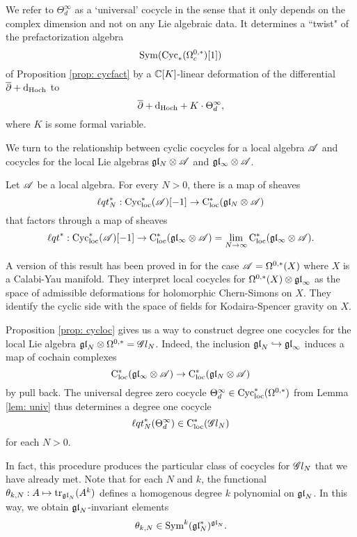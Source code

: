 We refer to $\Theta^\infty_d$ as a `universal' cocycle in the sense that it only depends on the complex dimension and not on any Lie algebraic data. 
It determines a ``twist" of the prefactorization algebra 
\[
{\rm Sym}({\rm Cyc}_*(\Omega^{0,*}_c)[1])
\]
of Proposition \ref{prop: cycfact} by a $\mathbb C[K]$-linear deformation of the differential $\overline{\partial} + {\rm d}_{\rm Hoch}$ to
\[
\overline{\partial} + {\rm d}_{\rm Hoch} + K \cdot \Theta^\infty_d ,
\] 
where $K$ is some formal variable. 

We turn to the relationship between cyclic cocycles for a local algebra $\mathscr A$ and cocycles for the local Lie algebras $\mathfrak{g} \mathfrak{l}_N \otimes \mathscr A$ and $\mathfrak{g} \mathfrak{l}_\infty \otimes \mathscr A$.

\begin{prop}
\label{prop: cycloc}
Let $\mathscr A$ be a local algebra.
For every $N > 0$, there is a map of sheaves
\[
{\ell q t}_N^* : {\rm Cyc}_{\rm loc}^*(\mathscr A)[-1] \to {\rm C}_{\rm loc}^*(\mathfrak{g} \mathfrak{l}_N \otimes \mathscr A) 
\] 
that factors through a map of sheaves
\[
{\ell q t}^* : {\rm Cyc}_{\rm loc}^*(\mathscr A)[-1] \to {\rm C}_{\rm loc}^*(\mathfrak{g} \mathfrak{l}_\infty \otimes \mathscr A) = \lim_{N \to \infty} {\rm C}_{\rm loc}^*(\mathfrak{g} \mathfrak{l}_\infty \otimes \mathscr A)  .
\]
\end{prop}


\begin{rmk}
A version of this result has been proved in \cite{CL1} for the case $\mathscr A = \Omega^{0,*}(X)$ where $X$ is a Calabi-Yau manifold.
They interpret local cocycles for $\Omega^{0,*}(X) \otimes {\mathfrak{gl}}_\infty$ as the space of admissible deformations for holomorphic Chern-Simons on $X$. 
They identify the cyclic side with the space of fields for Kodaira-Spencer gravity \cite{BCOV} on $X$.
\end{rmk}

Proposition \ref{prop: cycloc} gives us a way to construct degree one cocycles for the local Lie algebra ${\mathfrak{gl}}_N \otimes \Omega^{0,*} = \mathscr G l_{N}$. 
Indeed, the inclusion ${\mathfrak{gl}}_N \hookrightarrow {\mathfrak{gl}}_\infty$ induces a map of cochain complexes 
\[
{\rm C}_{\rm loc}^*(\mathfrak{g} \mathfrak{l}_\infty \otimes \mathscr A) \to {\rm C}_{\rm loc}^*(\mathfrak{g} \mathfrak{l}_N \otimes \mathscr A)
\]
by pull back. 
The universal degree zero cocycle $\Theta_d^\infty \in {\rm Cyc}_{\rm loc}^*(\Omega^{0,*})$ from Lemma \ref{lem: univ} thus determines a degree one cocycle 
\[
{\ell q t}^*_N(\Theta_d^\infty) \in {\rm C}_{\rm loc}^*(\mathscr G l_N)
\]
for each $N > 0$. 

In fact, this procedure produces the particular class of cocycles for $\mathscr G l_{N}$ that we have already met. 
Note that for each $N$ and $k$, the functional $\theta_{k,N} : A \mapsto {\rm tr}_{{\mathfrak{gl}}_N} (A^k)$ defines a homogenous degree $k$ polynomial on ${\mathfrak{gl}}_N$. 
In this way, we obtain ${\mathfrak{gl}}_N$-invariant elements
\[
\theta_{k,N} \in {\rm Sym}^{k}({\mathfrak{gl}}_N^*)^{{\mathfrak{gl}}_N} .
\]

